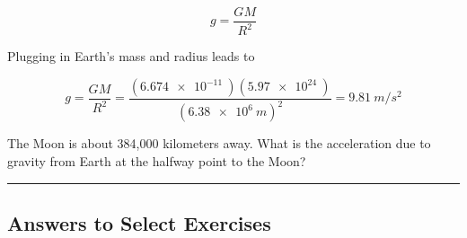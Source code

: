 \documentclass[main.tex]{subfiles}
\begin{document}
\begin{equation}
    g = \frac{GM}{R^2}
\end{equation}


Plugging in Earth's mass and radius leads to 

\begin{equation*} 
    g = \frac{GM}{R^2} = \frac{\left(\SI{6.674e-11}{}\right)\left(\SI{5.97e24}{}\right)}{\left(\SI{6.38e6}{m}\right)^2} = \SI{9.81}{m/s^2}
\end{equation*}




\begin{exercise} \label{knMwSV}
The Moon is about 384,000 kilometers away. What is the acceleration due to gravity from Earth at the halfway point to the Moon? 
\end{exercise}

\hrule







\clearpage
\printnoidxglossaries


\clearpage
\subsection{Answers to Select Exercises}
\end{document}
